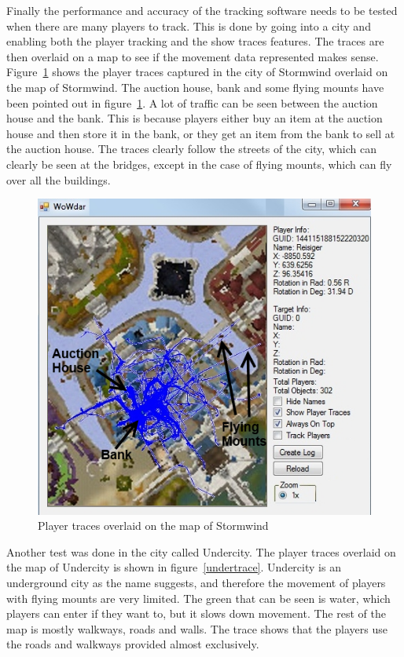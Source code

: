Finally the performance and accuracy of the tracking software needs to be tested when there are many players to track. This is done by going into a city and enabling both the player tracking and the show traces features. The traces are then overlaid on a map to see if the movement data represented makes sense. Figure~\ref{stormtrace} shows the player traces captured in the city of Stormwind overlaid on the map of Stormwind. The auction house, bank and some flying mounts have been pointed out in figure~\ref{stormtrace}. A lot of traffic can be seen between the auction house and the bank. This is because players either buy an item at the auction house and then store it in the bank, or they get an item from the bank to sell at the auction house. The traces clearly follow the streets of the city, which can clearly be seen at the bridges, except in the case of flying mounts, which can fly over all the buildings.

\begin{figure}[htbp]
\centering
\includegraphics[scale = 0.75]{stormoverlay.png}	
\caption{Player traces overlaid on the map of Stormwind}
\label{stormtrace}
\end{figure}

Another test was done in the city called Undercity. The player traces overlaid on the map of Undercity is shown in figure~\ref{undertrace}. Undercity is an underground city as the name suggests, and therefore the movement of players with flying mounts are very limited. The green that can be seen is water, which players can enter if they want to, but it slows down movement. The rest of the map is mostly walkways, roads and walls. The trace shows that the players use the roads and walkways provided almost exclusively.

